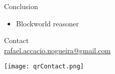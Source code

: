 \documentclass[aspectratio=169]{audition-beamer}
\begin{document}
\begin{frame}{Conclusion}
  \begin{itemize}
    \item<+-> Blockworld reasoner
  \end{itemize}
\end{frame}

\begin{frame}[plain]
  \centering
  \vfill
  \begin{minipage}[t]{.5\linewidth}
    \small
    \centering
    Contact\\
    \href{mailto:rafael.accacio.nogueira@gmail.com?subject=Seminaire RIS Minecraft}{rafael.accacio.nogueira@gmail.com}

    \texttt{[image: qrContact.png]}
  \end{minipage}
  \fi
\end{frame}

\appendix
\end{document}
